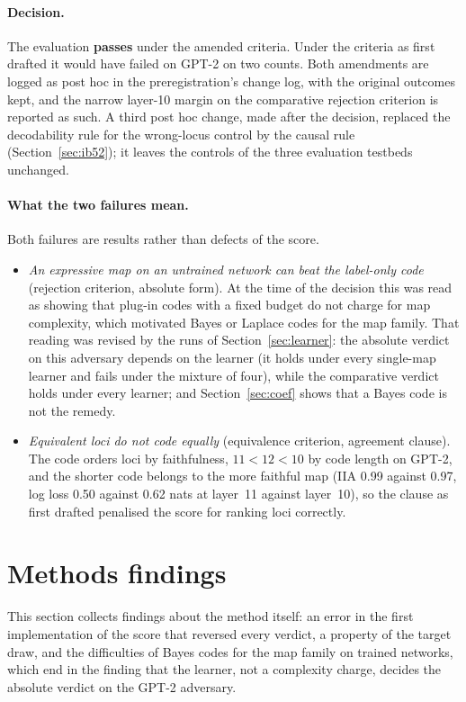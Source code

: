 \documentclass[11pt,a4paper]{article}
\begin{document}
\paragraph{Decision.} The evaluation \textbf{passes} under the amended criteria. Under the criteria as first drafted it would have failed on GPT-2 on two counts. Both amendments are logged as post hoc in the preregistration's change log, with the original outcomes kept, and the narrow layer-10 margin on the comparative rejection criterion is reported as such. A third post hoc change, made after the decision, replaced the decodability rule for the wrong-locus control by the causal rule (Section~\ref{sec:ib52}); it leaves the controls of the three evaluation testbeds unchanged.

\paragraph{What the two failures mean.} Both failures are results rather than defects of the score.
\begin{itemize}
\item \emph{An expressive map on an untrained network can beat the label-only code} (rejection criterion, absolute form). At the time of the decision this was read as showing that plug-in codes with a fixed budget do not charge for map complexity, which motivated Bayes or Laplace codes for the map family. That reading was revised by the runs of Section~\ref{sec:learner}: the absolute verdict on this adversary depends on the learner (it holds under every single-map learner and fails under the mixture of four), while the comparative verdict holds under every learner; and Section~\ref{sec:coef} shows that a Bayes code is not the remedy.
\item \emph{Equivalent loci do not code equally} (equivalence criterion, agreement clause). The code orders loci by faithfulness, $11<12<10$ by code length on GPT-2, and the shorter code belongs to the more faithful map (IIA 0.99 against 0.97, log loss 0.50 against 0.62 nats at layer~11 against layer~10), so the clause as first drafted penalised the score for ranking loci correctly.
\end{itemize}

\section{Methods findings}
\label{sec:methods}

This section collects findings about the method itself: an error in the first implementation of the score that reversed every verdict, a property of the target draw, and the difficulties of Bayes codes for the map family on trained networks, which end in the finding that the learner, not a complexity charge, decides the absolute verdict on the GPT-2 adversary.
\end{document}
